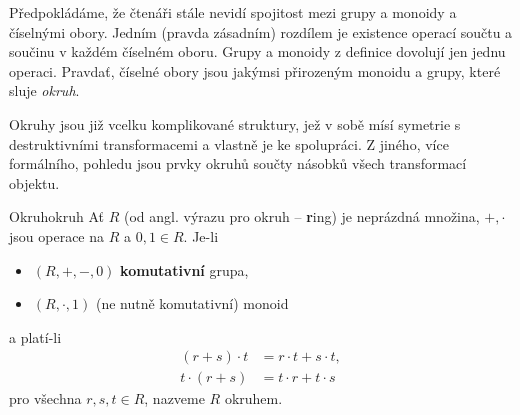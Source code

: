Předpokládáme, že čtenáři stále nevidí spojitost mezi grupy a monoidy a
číselnými obory. Jedním (pravda zásadním) rozdílem je existence operací součtu a
součinu v každém číselném oboru. Grupy a monoidy z definice dovolují jen jednu
operaci. Pravdať, číselné obory jsou jakýmsi přirozeným  monoidu a
grupy, které sluje \emph{okruh}.

Okruhy jsou již vcelku komplikované struktury, jež v sobě mísí symetrie s
destruktivními transformacemi a vlastně je  ke spolupráci. Z
jiného, více formálního, pohledu jsou prvky okruhů součty násobků všech
transformací objektu.

\begin{definition}{Okruh}{okruh}
 Ať $R$ (od angl. výrazu pro okruh -- \textbf{r}ing) je neprázdná množina, $+,
 \cdot $ jsou operace na $R$ a $0,1 \in R$. Je-li
 \begin{itemize}
  \item $(R,+,-,0)$ \textbf{komutativní} grupa,
  \item $(R, \cdot ,1)$ (ne nutně komutativní) monoid
 \end{itemize}
 a platí-li 
 \begin{equation}
  \label{eq:distributivita}
  \begin{split}
   (r + s) \cdot t &= r \cdot t + s \cdot t,\\
   t \cdot (r + s) &= t \cdot r + t \cdot s
  \end{split}
 \end{equation}
 pro všechna $r,s,t \in R$, nazveme $R$ okruhem. 
\end{definition}

